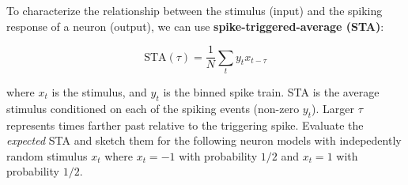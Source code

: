 \documentclass[letterpaper,11pt]{exam}
\begin{document}
\begin{questions}
\question To characterize the relationship between the stimulus (input) and the spiking response of a neuron (output), we can use \textbf{spike-triggered-average (STA)}:
\begin{tcolorbox}[colback=red!5!white,colframe=red!50!black]
\noindent
\begin{equation}\label{eq:sta}
    \text{STA}(\tau) = \frac{1}{N} \sum_t y_{t} x_{t-\tau}
\end{equation}
\end{tcolorbox}
where $x_t$ is the stimulus, and $y_t$ is the binned spike train.
STA is the average stimulus conditioned on each of the spiking events (non-zero $y_t$).
Larger $\tau$ represents times farther past relative to the triggering spike.
Evaluate the \emph{expected} STA and sketch them for the following neuron models with indepedently random stimulus $x_t$ where $x_t = -1$ with probability $1/2$ and $x_t = 1$ with probability $1/2$.


\end{questions}
\end{document}
